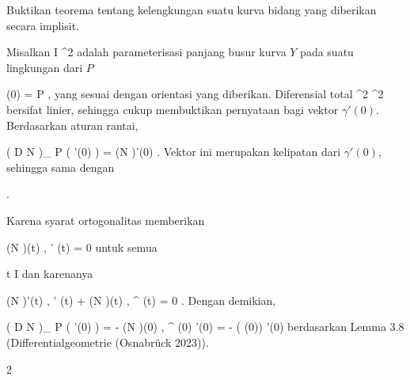 {

Buktikan teorema tentang kelengkungan suatu kurva bidang yang diberikan secara implisit.

}
{

Misalkan
\maabb {\gamma} { I } { \R^2
} {}
adalah parameterisasi panjang busur kurva $Y$ pada suatu lingkungan dari $P$

\mavergleichskette
{\vergleichskette
{ \gamma (0)
}
{ = }{ P
}
{ }{
}
{ }{
}
{ }{
}
}
{}{}{,}
yang sesuai dengan orientasi yang diberikan. Diferensial total
 { \R^2} {\R^2
} {}
bersifat linier, sehingga cukup membuktikan pernyataan bagi vektor $\gamma'(0)$. Berdasarkan
aturan rantai,

\mavergleichskettedisp
{\vergleichskette
{ \left(  D N   \right)_{ P } \left(   \gamma'(0)  \right)
}
{ =} { (N \circ \gamma )'(0)
}
{ } {
}
{ } {
}
{ } {
}
}
{}{}{.}
Vektor ini merupakan kelipatan dari $\gamma'(0)$, sehingga sama dengan

 { . }

Karena syarat ortogonalitas memberikan

\mavergleichskettedisp
{\vergleichskette
{ \left\langle (N \circ \gamma)(t) , \gamma' (t) \right\rangle
}
{ =} { 0
}
{ } {
}
{ } {
}
{ } {
}
}
{}{}{}
untuk semua

\mavergleichskette
{\vergleichskette
{ t
}
{ \in }{ I
}
{ }{
}
{ }{
}
{ }{
}
}
{}{}{}
dan karenanya

\mavergleichskettedisp
{\vergleichskette
{ \left\langle (N \circ \gamma)'(t) , \gamma' (t) \right\rangle + \left\langle (N \circ \gamma)(t) , \gamma^{\prime \prime} (t) \right\rangle
}
{ =} { 0
}
{ } {
}
{ } {
}
{ } {
}
}
{}{}{.}
Dengan demikian,

\mavergleichskettedisp
{\vergleichskette
{ \left(  D N   \right)_{ P } \left(   \gamma'(0)  \right)
}
{ =} { - \left\langle  (N \circ  \gamma)(0) ,  \gamma^{\prime \prime} (0)   \right\rangle  \gamma'(0)
}
{ =} { - \kappa( \gamma(0)) \gamma'(0)
}
{ } {
}
{ } {
}
}
{}{}{}
berdasarkan
Lemma 3.8 (Differentialgeometrie (Osnabrück 2023)).

 }



{2}

